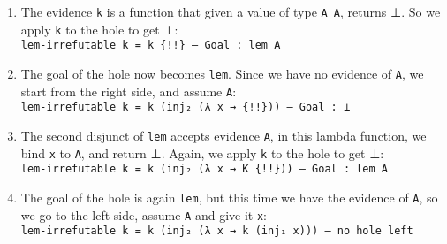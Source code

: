 \documentclass{lecturenotes}
\newcommand{\agdaempty}{\textsf{⊥}\xspace}
\begin{document}
\begin{itemize}
\begin{enumerate}
\item The evidence \texttt{k} is a function that given a value of type \texttt{A \uplus \lnot A},
      returns \agdaempty. So we apply \texttt{k} to the hole to get \agdaempty :
      \\ \texttt{lem-irrefutable k = k \{!!\} -- Goal : lem A} 

\item The goal of the hole now becomes \texttt{lem}. Since we have no evidence of \texttt{A},
      we start from the right side, and assume \texttt{\lnot A}:
      \\ \texttt{lem-irrefutable k = k (inj₂ (λ x → \{!!\})) -- Goal : \agdaempty}

\item The second disjunct of \texttt{lem} accepts evidence \texttt{\lnot A}, in this lambda function, we bind \texttt{x}
      to \texttt{A}, and return \agdaempty. Again, we apply \texttt{k} to the hole to get \agdaempty :
      \\ \texttt{lem-irrefutable k = k (inj₂ (λ x → K \{!!\})) -- Goal : lem A}

\item The goal of the hole is again \texttt{lem}, but this time we have the evidence of \texttt{A},
      so we go to the left side, assume \texttt{A} and give it \texttt{x}:
      \\ \texttt{lem-irrefutable k = k (inj₂ (λ x → k (inj₁ x))) -- no hole left}
\end{enumerate}
\end{itemize} %
\end{document}
